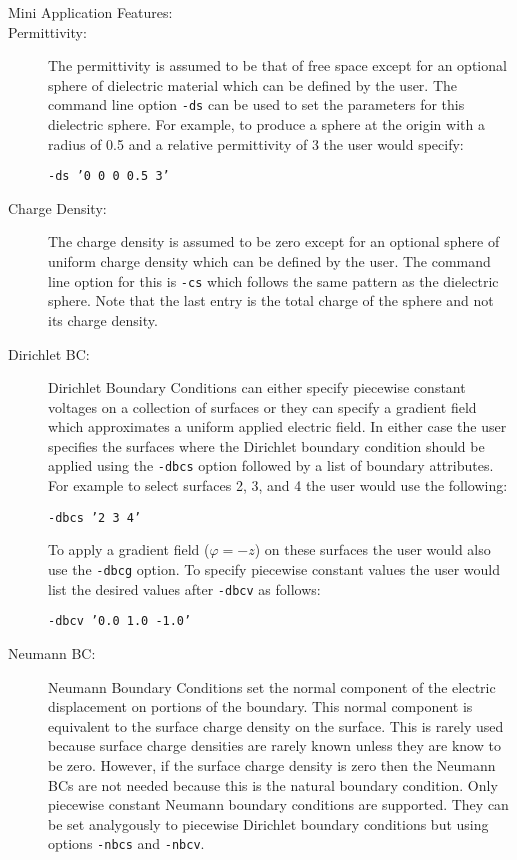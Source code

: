 \documentclass{article}
\begin{document}
\begin{description}
\item[Mini Application Features:]
\item[Permittivity:] The permittivity is assumed to be that of free
  space except for an optional sphere of dielectric material which can
  be defined by the user.  The command line option {\tt -ds} can be
  used to set the parameters for this dielectric sphere.  For example,
  to produce a sphere at the origin with a radius of 0.5 and a
  relative permittivity of 3 the user would specify:
  \begin{center}{\tt -ds '0 0 0 0.5 3'}\end{center}

\item[Charge Density:] The charge density is assumed to be zero except
  for an optional sphere of uniform charge density which can be
  defined by the user.  The command line option for this is {\tt -cs}
  which follows the same pattern as the dielectric sphere.  Note that
  the last entry is the total charge of the sphere and not its charge
  density.

\item[Dirichlet BC:] Dirichlet Boundary Conditions can either specify
  piecewise constant voltages on a collection of surfaces or they can
  specify a gradient field which approximates a uniform applied
  electric field.  In either case the user specifies the surfaces
  where the Dirichlet boundary condition should be applied using the
  {\tt -dbcs} option followed by a list of boundary attributes.
  For example to select surfaces 2, 3, and 4 the user would use the
  following:
  \begin{center}{\tt -dbcs '2 3 4'}\end{center}
  To apply a gradient field ($\varphi = -z$) on these surfaces the
  user would also use the {\tt -dbcg} option.  To specify piecewise
  constant values the user would list the desired values after
  {\tt -dbcv} as follows:
  \begin{center}{\tt -dbcv '0.0 1.0 -1.0'}\end{center}

\item[Neumann BC:] Neumann Boundary Conditions set the normal
  component of the electric displacement on portions of the boundary.
  This normal component is equivalent to the surface charge density on
  the surface.  This is rarely used because surface charge densities
  are rarely known unless they are know to be zero.  However, if the
  surface charge density is zero then the Neumann BCs are not needed
  because this is the natural boundary condition.  Only piecewise
  constant Neumann boundary conditions are supported.  They can be set
  analygously to piecewise Dirichlet boundary conditions but using
  options {\tt -nbcs} and {\tt -nbcv}.

\end{description}
\end{document}
